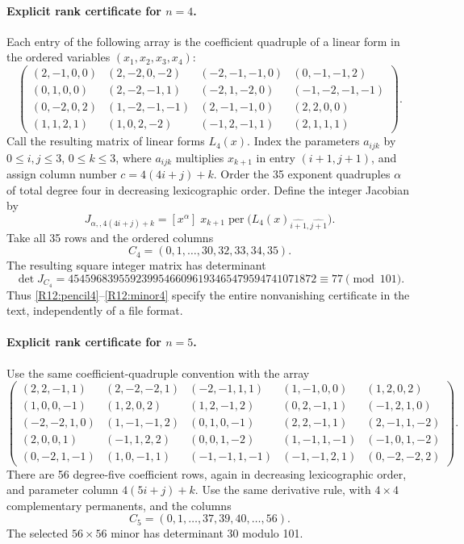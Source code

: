 \paragraph{Explicit rank certificate for $n=4$.}
Each entry of the following array is the coefficient quadruple of
a linear form in the ordered variables $(x_1,x_2,x_3,x_4)$:
\begin{equation}\label{R12:pencil4}
\begin{pmatrix}
(2,-1,0,0)&(2,-2,0,-2)&(-2,-1,-1,0)&(0,-1,-1,2)\\
(0,1,0,0)&(2,-2,-1,1)&(-2,1,-2,0)&(-1,-2,-1,-1)\\
(0,-2,0,2)&(1,-2,-1,-1)&(2,-1,-1,0)&(2,2,0,0)\\
(1,1,2,1)&(1,0,2,-2)&(-1,2,-1,1)&(2,1,1,1)
\end{pmatrix}.
\end{equation}
Call the resulting matrix of linear forms $L_4(x)$. Index the
parameters $a_{ijk}$ by $0\leq i,j\leq3$, $0\leq k\leq3$,
where $a_{ijk}$ multiplies $x_{k+1}$ in entry $(i+1,j+1)$,
and assign column number $c=4(4i+j)+k$.
Order the 35 exponent quadruples $\alpha$ of total degree four in
decreasing lexicographic order. Define the integer Jacobian by
\begin{equation}\label{R12:derivative}
 J_{\alpha,,4(4i+j)+k}
 =[x^\alpha]\;x_{k+1}
 \operatorname{per}\bigl(L_4(x)_{\widehat{i+1},\widehat{j+1}}\bigr).
\end{equation}
Take all 35 rows and the ordered columns
\[
 C_4=(0,1,\ldots,30,32,33,34,35).
\]
The resulting square integer matrix has determinant
\begin{equation}\label{R12:minor4}
 \det J_{C_4}
 =45459683955923995466096193465479594741071872
 \equiv77\pmod{101}.
\end{equation}
Thus \eqref{R12:pencil4}--\eqref{R12:minor4} specify the entire
nonvanishing certificate in the text, independently of a file format.

\paragraph{Explicit rank certificate for $n=5$.}
Use the same coefficient-quadruple convention with the array
\begin{equation}\label{R12:pencil5}
\begin{pmatrix}
(2,2,-1,1)&(2,-2,-2,1)&(-2,-1,1,1)&(1,-1,0,0)&(1,2,0,2)\\
(1,0,0,-1)&(1,2,0,2)&(1,2,-1,2)&(0,2,-1,1)&(-1,2,1,0)\\
(-2,-2,1,0)&(1,-1,-1,2)&(0,1,0,-1)&(2,2,-1,1)&(2,-1,1,-2)\\
(2,0,0,1)&(-1,1,2,2)&(0,0,1,-2)&(1,-1,1,-1)&(-1,0,1,-2)\\
(0,-2,1,-1)&(1,0,-1,1)&(-1,-1,1,-1)&(-1,-1,2,1)&(0,-2,-2,2)
\end{pmatrix}.
\end{equation}
There are 56 degree-five coefficient rows, again in decreasing
lexicographic order, and parameter column $4(5i+j)+k$.
Use the same derivative rule, with $4\times4$ complementary
permanents, and the columns
\[
 C_5=(0,1,\ldots,37,39,40,\ldots,56).
\]
The selected $56\times56$ minor has determinant $30$ modulo 101.

